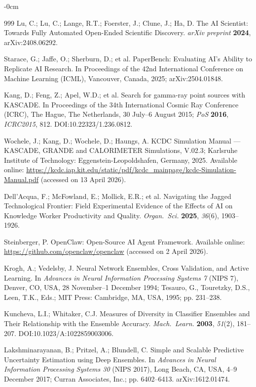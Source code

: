 \documentclass[universe,article,submit,pdftex,oneauthor]{Definitions/mdpi}
\begin{document}
\begin{adjustwidth}{-\extralength}{0cm}
\begin{thebibliography}{999}
Lu, C.; Lu, C.; Lange, R.T.; Foerster, J.; Clune, J.; Ha, D. The AI Scientist: Towards Fully Automated Open-Ended Scientific Discovery. \textit{arXiv preprint} \textbf{2024}, arXiv:2408.06292.

Starace, G.; Jaffe, O.; Sherburn, D.; et al. PaperBench: Evaluating AI's Ability to Replicate AI Research. In Proceedings of the 42nd International Conference on Machine Learning (ICML), Vancouver, Canada, 2025; arXiv:2504.01848.

Kang, D.; Feng, Z.; Apel, W.D.; et al. Search for gamma-ray point sources with KASCADE. In Proceedings of the 34th International Cosmic Ray Conference (ICRC), The Hague, The Netherlands, 30 July--6 August 2015; \textit{PoS} \textbf{2016}, \textit{ICRC2015}, 812. DOI:10.22323/1.236.0812.

Wochele, J.; Kang, D.; Wochele, D.; Haungs, A. KCDC Simulation Manual --- KASCADE, GRANDE and CALORIMETER Simulations, V.02.3; Karlsruhe Institute of Technology: Eggenstein-Leopoldshafen, Germany, 2025. Available online: \url{https://kcdc.iap.kit.edu/static/pdf/kcdc_mainpage/kcdc-Simulation-Manual.pdf} (accessed on 13 April 2026).

Dell'Acqua, F.; McFowland, E.; Mollick, E.R.; et al. Navigating the Jagged Technological Frontier: Field Experimental Evidence of the Effects of AI on Knowledge Worker Productivity and Quality. \textit{Organ.\ Sci.} \textbf{2025}, \textit{36}(6), 1903--1926.

Steinberger, P. OpenClaw: Open-Source AI Agent Framework. Available online: \url{https://github.com/openclaw/openclaw} (accessed on 2 April 2026).

Krogh, A.; Vedelsby, J. Neural Network Ensembles, Cross Validation, and Active Learning. In \textit{Advances in Neural Information Processing Systems 7} (NIPS 7), Denver, CO, USA, 28 November--1 December 1994; Tesauro, G., Touretzky, D.S., Leen, T.K., Eds.; MIT Press: Cambridge, MA, USA, 1995; pp. 231--238.

Kuncheva, L.I.; Whitaker, C.J. Measures of Diversity in Classifier Ensembles and Their Relationship with the Ensemble Accuracy. \textit{Mach.\ Learn.} \textbf{2003}, \textit{51}(2), 181--207. DOI:10.1023/A:1022859003006.

Lakshminarayanan, B.; Pritzel, A.; Blundell, C. Simple and Scalable Predictive Uncertainty Estimation using Deep Ensembles. In \textit{Advances in Neural Information Processing Systems 30} (NIPS 2017), Long Beach, CA, USA, 4--9 December 2017; Curran Associates, Inc.; pp. 6402--6413. arXiv:1612.01474.


\end{thebibliography}
\end{adjustwidth}
\end{document}

